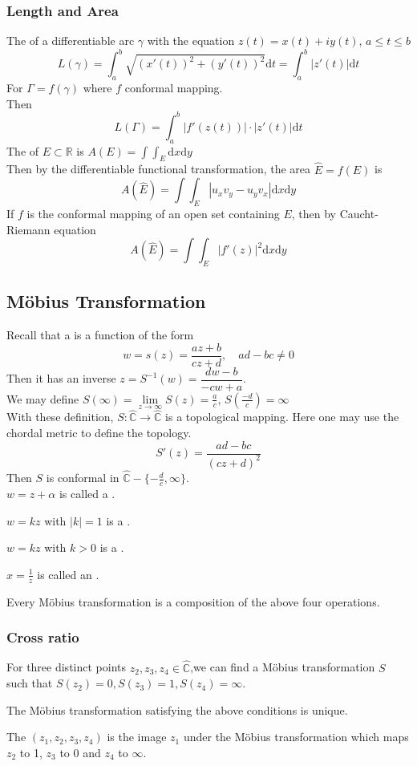 \subsubsection{Length and Area}
The  of a differentiable arc  $ \gamma $ with the equation  $ z(t)=x(t)+iy(t) $, $ a \leq t \leq b $
\[L(\gamma)=\int_{a }^{b }\sqrt{(x'(t))^2+(y'(t))^2}\mathrm{d}t=\int_{a }^{b }|z'(t)|\mathrm{d}t\]   
For  $ \Gamma=f(\gamma) $ where  $ f  $ conformal mapping.\\
Then 
\[L(\Gamma)=\int_{a}^{b}|f'(z(t))|\cdot|z'(t)|\mathrm{d}t\]
The  of  $ E\subset \mathbb{R} $ is  $ A(E)=\int \int_{E}\mathrm{d}x\mathrm{d}y $\\
Then by the differentiable functional transformation, the area $ \hat{E}=f(E) $ is 
\[A(\hat{E})=\int \int_E|u_xv_y-u_yv_x|\mathrm{d}x\mathrm{d}y\]  
If  $ f  $ is the conformal mapping of an open set containing  $ E  $, then by Caucht-Riemann equation
\[A(\hat{E})=\int\int_E|f'(z)|^2\mathrm{d}x\mathrm{d}y\]
\subsection{M{\"o}bius Transformation}
Recall that a  is a function of the form
\[w=s(z)=\frac{az+b}{cz+d},\quad ad-bc\neq0\]
Then it has an inverse  $ z=S^{-1}(w)=\dfrac{dw-b}{-cw+a} $.\\
We may define  $ S(\infty)=\lim\limits_{z\to \infty}S(z)=\frac{a }{c} $, $ S(\frac{-d }{c})=\infty $ \\
With these definition,  $ S:\hat{\mathbb{C}}\rightarrow\hat{\mathbb{C}} $ is a topological mapping. Here one may use the chordal metric to define the topology.\\
\[S'(z)=\frac{ad-bc}{(cz+d)^2}\]
Then  $ S  $ is conformal in  $ \hat{\mathbb{C}}-\{-\frac{d }{c},\infty\} $.\\
$ w=z+\alpha  $ is called a .

$ w=kz  $ with  $ |k|=1 $ is a .

$ w=kz $ with  $ k>0  $ is a .

$ x=\frac{1 }{z }  $ is called an .
\begin{proposition}
    Every M{\"o}bius transformation is a composition of the above four operations.
\end{proposition}    
\subsubsection{Cross ratio}
For three distinct points  $ z_2,z_3,z_4\in\hat{\mathbb{C}} $,we can find a M{\"o}bius transformation  $ S $ such that  $ S(z_2)=0,S(z_3)=1,S(z_4)=\infty $.
\begin{lemma}
    The M{\"o}bius transformation satisfying the above conditions is unique.
\end{lemma}
The  $ (z_1,z_2,z_3,z_4) $ is the image  $ z_1 $ under the M{\"o}bius transformation which maps  $ z_2  $ to 1, $ z_3  $ to 0 and $ z_4  $ to  $ \infty $.

